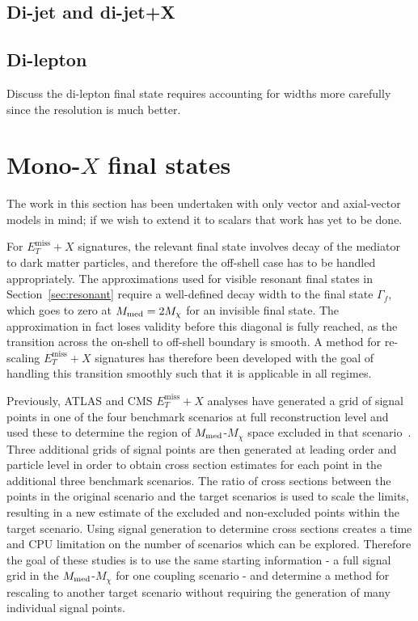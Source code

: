 \documentclass[a4paper, 11pt,notoc]{article}
\newcommand{\MET}{\ensuremath{E_T^\mathrm{miss}}\xspace}
\newcommand{\mDM}{\ensuremath{M_{\chi}}\xspace}
\newcommand{\mMed}{\ensuremath{M_{\rm{med}}}\xspace}
\newcommand{\metplusx}{\ensuremath{\MET+X}\xspace}
\begin{document}
\subsection{Di-jet and di-jet+X}

\subsection{Di-lepton}

Discuss the di-lepton final state requires accounting for widths more carefully since the resolution is much better.


\section{Mono-$X$ final states}
\label{sec:monox}

{\color{red} The work in this section has been undertaken with only vector and axial-vector models in mind; if we wish to extend it to scalars that work has yet to be done.}

For \metplusx signatures, the relevant final state involves decay of the mediator to dark matter particles, and therefore the off-shell case has to be handled appropriately.
The approximations used for visible resonant final states in Section~\ref{sec:resonant} require a well-defined decay width to the final state $\Gamma_f$, which goes to zero at $\mMed=2\mDM$ for an invisible final state. The approximation in fact loses validity before this diagonal is fully reached, as the transition across the on-shell to off-shell boundary is smooth. A method for re-scaling \metplusx signatures has therefore been developed with the goal of handling this transition smoothly such that it is applicable in all regimes.

Previously, ATLAS and CMS \metplusx analyses have generated a grid of signal points in one of the four benchmark scenarios at full reconstruction level and used these to determine the region of \mMed-\mDM space excluded in that scenario~\cite{atlas_monojet_36ifb, cms_monojet_12ifb}. Three additional grids of signal points are then generated at leading order and particle level in order to obtain cross section estimates for each point in the additional three benchmark scenarios. The ratio of cross sections between the points in the original scenario and the target scenarios is used to scale the limits, resulting in a new estimate of the excluded and non-excluded points within the target scenario. 
Using signal generation to determine cross sections creates a time and CPU limitation on the number of scenarios which can be explored. 
Therefore the goal of these studies is to use the same starting information - a full signal grid in the \mMed-\mDM for one coupling scenario - and determine a method for rescaling to another target scenario without requiring the generation of many individual signal points. 
\end{document}
